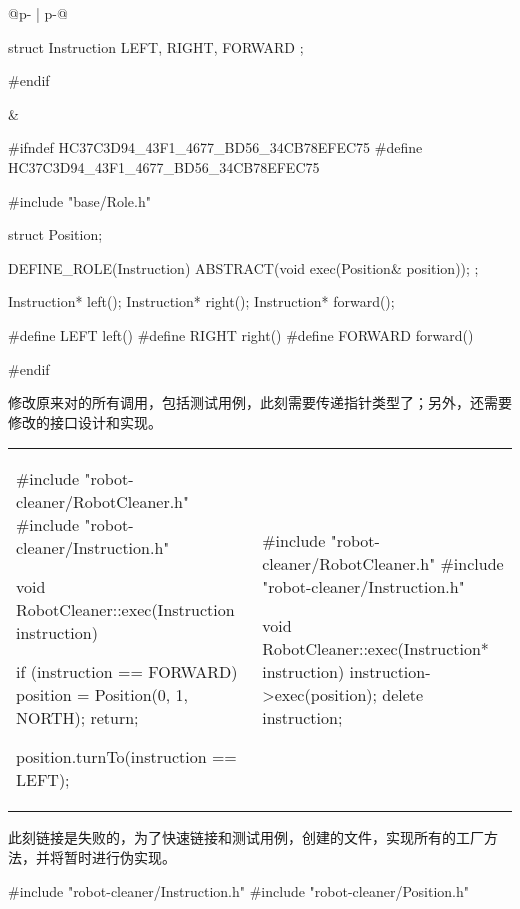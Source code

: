 \begin{content}
\begin{tabular}{@{}p{} 
                 | p{}@{}}
\begin{c++}[caption={include/robot-cleaner/Instruction.h}]
struct Instruction { LEFT, RIGHT, FORWARD };

#endif
\end{c++}
&
\begin{c++}[caption={include/robot-cleaner/Instruction.h}]
#ifndef HC37C3D94_43F1_4677_BD56_34CB78EFEC75
#define HC37C3D94_43F1_4677_BD56_34CB78EFEC75

#include "base/Role.h"

struct Position;

DEFINE_ROLE(Instruction)
{
    ABSTRACT(void exec(Position& position));
};

Instruction* left();
Instruction* right();
Instruction* forward();

#define LEFT    left()
#define RIGHT   right()
#define FORWARD forward()

#endif
\end{c++}
\end{tabular}

修改原来对的所有调用，包括测试用例，此刻需要传递指针类型了；另外，还需要修改的接口设计和实现。

\begin{tabular}{@{}p{} 
                 | p{}@{}}
\begin{c++}[caption={src/robot-cleaner/RobotCleaner.cpp}]
#include "robot-cleaner/RobotCleaner.h"
#include "robot-cleaner/Instruction.h"

void RobotCleaner::exec(Instruction instruction)
{
    if (instruction == FORWARD)
    {
        position = Position(0, 1, NORTH);
        return;
    }

    position.turnTo(instruction == LEFT);
}
\end{c++}
&
\begin{c++}[caption={src/robot-cleaner/RobotCleaner.cpp}]
#include "robot-cleaner/RobotCleaner.h"
#include "robot-cleaner/Instruction.h"

void RobotCleaner::exec(Instruction* instruction)
{
    instruction->exec(position);
    delete instruction;
}
\end{c++}
\end{tabular}

此刻链接是失败的，为了快速链接和测试用例，创建的文件，实现所有的工厂方法，并将暂时进行伪实现。

\begin{leftbar}
\begin{c++}[caption={src/robot-cleaner/Instruction.cpp}]
#include "robot-cleaner/Instruction.h"
#include "robot-cleaner/Position.h"


\end{c++}
\end{leftbar}
\end{content}
